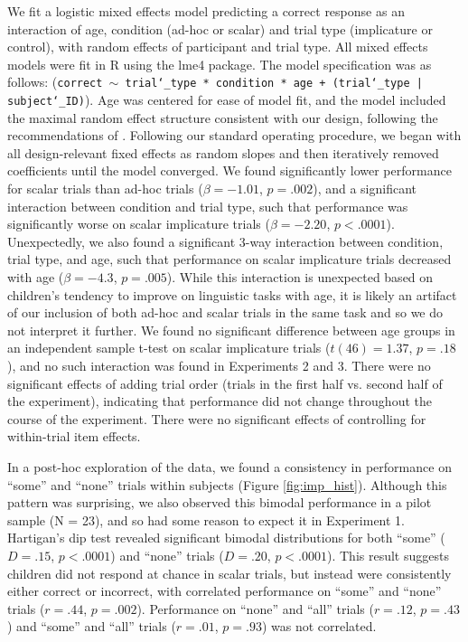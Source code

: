 \documentclass[man]{apa2}
\begin{document}
We fit a logistic mixed effects model predicting a correct response as an interaction of age, condition (ad-hoc or scalar) and trial type (implicature or control), with random effects of participant and trial type. All mixed effects models were fit in R using the lme4 package. The model specification was as follows: ({\tt{correct $\sim$ trial\char`_type * condition * age + (trial\char`_type | subject\char`_ID)}}). Age was centered for ease of model fit, and the model included the maximal random effect structure consistent with our design, following the recommendations of . Following our standard operating procedure, we began with all design-relevant fixed effects as random slopes and then iteratively removed coefficients until the model converged. We found significantly lower performance for scalar trials than ad-hoc trials ($\beta = -1.01$, $p = .002$), and a significant interaction between condition and trial type, such that performance was significantly worse on scalar implicature trials ($\beta = -2.20$, $p < .0001$). Unexpectedly, we also found a significant 3-way interaction between condition, trial type, and age, such that performance on scalar implicature trials decreased with age ($\beta = -4.3$, $p = .005$). While this interaction is unexpected based on children's tendency to improve on linguistic tasks with age, it is likely an artifact of our inclusion of both ad-hoc and scalar trials in the same task and so we do not interpret it further. We found no significant difference between age groups in an independent sample t-test on scalar implicature trials ($t(46) = 1.37$, $p = .18$), and no such interaction was found in Experiments 2 and 3. There were no significant effects of adding trial order (trials in the first half vs. second half of the experiment), indicating that performance did not change throughout the course of the experiment. There were no significant effects of controlling for within-trial item effects.

In a post-hoc exploration of the data, we found a consistency in performance on ``some'' and ``none'' trials within subjects (Figure \ref{fig:imp_hist}). Although this pattern was surprising, we also observed this bimodal performance in a pilot sample (N = 23), and so had some reason to expect it in Experiment 1. Hartigan's dip test revealed significant bimodal distributions for both ``some'' ($D = .15$, $p <  .0001$) and ``none'' trials ($D = .20$, $p < .0001$). This result suggests children did not respond at chance in scalar trials, but instead were consistently either correct or incorrect, with correlated performance on ``some'' and ``none'' trials ($r = .44$, $p =  .002$). Performance on ``none'' and ``all'' trials ($r = .12$, $p = .43$) and ``some'' and ``all'' trials ($r = .01$, $p = .93$) was not correlated.
\end{document}
